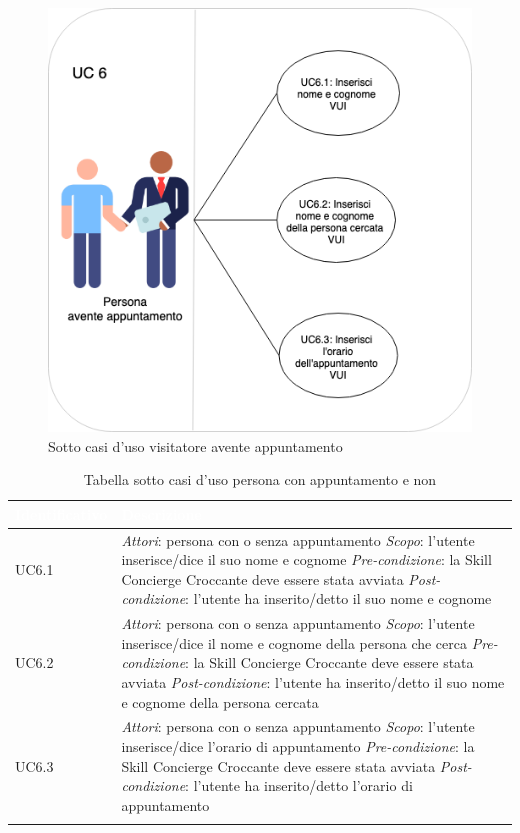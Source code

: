 \begin{figure}[H] 
    \centering 
    \includegraphics[width=0.7\columnwidth]{immagini/casi_duso2.png}
    \caption{\label{fig:sotto_casi_duso_visitatori1}Sotto casi d'uso visitatore avente appuntamento}
\end{figure}
\begin{center}
	\centering
	\renewcommand{\arraystretch}{1.5}
	\begin{longtable}{  p{2.5cm} p{9.6cm} }
		\rowcolor{tableHead}
		\textbf{\textcolor{white}{Identificativo}} & \textbf{\textcolor{white}{Descrizione}} \\
		\endhead  
		
		UC6.1 &  \textit{Attori}: persona con o senza appuntamento \newline \textit{Scopo}: l'utente inserisce/dice il suo nome e cognome \newline \textit{Pre-condizione}: la Skill Concierge Croccante deve essere stata avviata \newline \textit{Post-condizione}: l'utente ha inserito/detto il suo nome e cognome \\
		
		UC6.2 &  \textit{Attori}: persona con o senza appuntamento \newline \textit{Scopo}: l'utente inserisce/dice il nome e cognome della persona che cerca \newline \textit{Pre-condizione}: la Skill Concierge Croccante deve essere stata avviata \newline \textit{Post-condizione}: l'utente ha inserito/detto il suo nome e cognome della persona cercata \\
		
		UC6.3 &  \textit{Attori}: persona con o senza appuntamento \newline \textit{Scopo}: l'utente inserisce/dice l'orario di appuntamento \newline \textit{Pre-condizione}: la Skill Concierge Croccante deve essere stata avviata \newline \textit{Post-condizione}: l'utente ha inserito/detto l'orario di appuntamento \\
		
		\rowcolor{white}
		\caption{Tabella sotto casi d'uso persona con appuntamento e non}
	\end{longtable}
\end{center}
